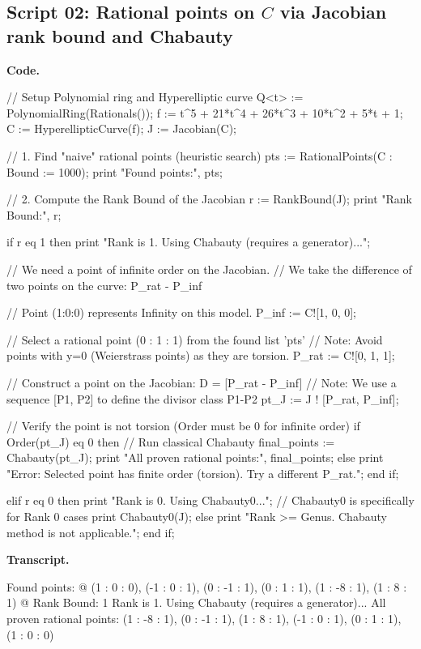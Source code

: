 \documentclass[12pt]{article}
\theoremstyle{remark}
\theoremstyle{definition}
\begin{document}
\subsection*{Script 02: Rational points on $C$ via Jacobian rank bound and Chabauty}
\noindent\textbf{Code.}
\begin{code}
// Setup Polynomial ring and Hyperelliptic curve
Q<t> := PolynomialRing(Rationals());
f := t^5 + 21*t^4 + 26*t^3 + 10*t^2 + 5*t + 1;
C := HyperellipticCurve(f);
J := Jacobian(C);

// 1. Find "naive" rational points (heuristic search)
pts := RationalPoints(C : Bound := 1000);
print "Found points:", pts;

// 2. Compute the Rank Bound of the Jacobian
r := RankBound(J);
print "Rank Bound:", r; 

if r eq 1 then
    print "Rank is 1. Using Chabauty (requires a generator)...";
    
    // We need a point of infinite order on the Jacobian.
    // We take the difference of two points on the curve: P_rat - P_inf
    
    // Point (1:0:0) represents Infinity on this model.
    P_inf := C![1, 0, 0]; 
    
    // Select a rational point (0 : 1 : 1) from the found list 'pts'
    // Note: Avoid points with y=0 (Weierstrass points) as they are torsion.
    P_rat := C![0, 1, 1]; 
    
    // Construct a point on the Jacobian: D = [P_rat - P_inf]
    // Note: We use a sequence [P1, P2] to define the divisor class P1-P2
    pt_J := J ! [P_rat, P_inf];
    
    // Verify the point is not torsion (Order must be 0 for infinite order)
    if Order(pt_J) eq 0 then
        // Run classical Chabauty
        final_points := Chabauty(pt_J);
        print "All proven rational points:", final_points;
    else
        print "Error: Selected point has finite order (torsion). Try a different P_rat.";
    end if;

elif r eq 0 then
    print "Rank is 0. Using Chabauty0...";
    // Chabauty0 is specifically for Rank 0 cases
    print Chabauty0(J);
else
    print "Rank >= Genus. Chabauty method is not applicable.";
end if;
\end{code}

\noindent\textbf{Transcript.}
\begin{term}
Found points: {@ (1 : 0 : 0), (-1 : 0 : 1), (0 : -1 : 1), (0 : 1 : 1), (1 : -8 :
1), (1 : 8 : 1) @}
Rank Bound: 1
Rank is 1. Using Chabauty (requires a generator)...
All proven rational points: { (1 : -8 : 1), (0 : -1 : 1), (1 : 8 : 1), (-1 : 0 :
1), (0 : 1 : 1), (1 : 0 : 0) }
\end{term}
\end{document}
